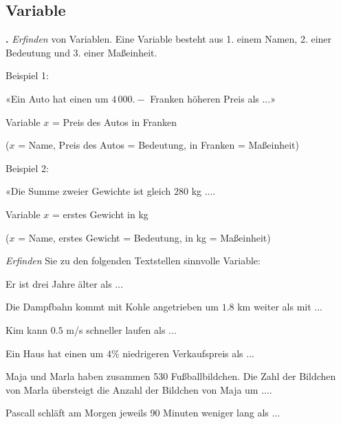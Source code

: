\newpage



\subsection{Variable}
\textbf{\bbwAufgabenNummer{}.}
\textit{Erfinden} von Variablen. Eine Variable besteht aus 1. einem
Namen, 2. einer Bedeutung und 3. einer Maßeinheit.

Beispiel 1:

«Ein Auto hat einen um $4\,000.-$ Franken höheren Preis als ...»

Variable $x$ = Preis des Autos in Franken

($x$ = Name, Preis des Autos = Bedeutung, in Franken = Maßeinheit)

Beispiel 2:

«Die Summe zweier Gewichte ist gleich $280$ kg ....

Variable $x$ = erstes Gewicht in kg

($x$ = Name, erstes Gewicht = Bedeutung, in kg = Maßeinheit)


\textit{Erfinden} Sie zu den folgenden Textstellen sinnvolle Variable:

\begin{bbwAufgabenBlock}


\item Er ist drei Jahre älter als ...


\item Die Dampfbahn kommt mit Kohle angetrieben um $1.8$ km weiter als
mit ...


\item Kim kann $0.5$ m/s schneller laufen als ...


\item Ein Haus hat einen um $4$\% niedrigeren Verkaufspreis als ...


\noTRAINER{\newpage}

\item Maja und Marla haben zusammen 530 Fußballbildchen. Die Zahl der
Bildchen von Marla übersteigt die Anzahl der Bildchen von Maja um ....


\item Pascall schläft am Morgen jeweils 90 Minuten weniger lang als ...


\end{bbwAufgabenBlock}

